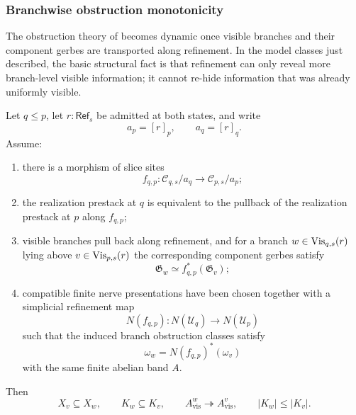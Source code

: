 \subsubsection{Branchwise obstruction monotonicity}

The obstruction theory of  becomes dynamic once visible branches and their component gerbes are transported along refinement. In the model classes just described, the basic structural fact is that refinement can only reveal more branch-level visible information; it cannot re-hide information that was already uniformly visible.

\begin{proposition}\label{thm:branch-visibility-monotonicity}
Let $q\le p$, let $r:\mathsf{Ref}_s$ be admitted at both states, and write
\[
a_p=[r]_p,
\qquad
a_q=[r]_q.
\]
Assume:
\begin{enumerate}[label=(\roman*),nosep]
\item there is a morphism of slice sites
\[
f_{q,p}:\mathcal C_{q,s}/a_q\to \mathcal C_{p,s}/a_p;
\]
\item the realization prestack at $q$ is equivalent to the pullback of the realization prestack at $p$ along $f_{q,p}$;
\item visible branches pull back along refinement, and for a branch $w\in \mathrm{Vis}_{q,s}(r)$ lying above $v\in \mathrm{Vis}_{p,s}(r)$ the corresponding component gerbes satisfy
\[
\mathfrak G_w\simeq f_{q,p}^*(\mathfrak G_v);
\]
\item compatible finite nerve presentations have been chosen together with a simplicial refinement map
\[
N(f_{q,p}):N(\mathcal U_q)\to N(\mathcal U_p)
\]
such that the induced branch obstruction classes satisfy
\[
\omega_w=N(f_{q,p})^*(\omega_v)
\]
with the same finite abelian band $A$.
\end{enumerate}
Then
\[
X_v\subseteq X_w,
\qquad
K_w\subseteq K_v,
\qquad
A_{\mathrm{vis}}^w\twoheadrightarrow A_{\mathrm{vis}}^v,
\qquad
|K_w|\le |K_v|.
\]
\end{proposition}

